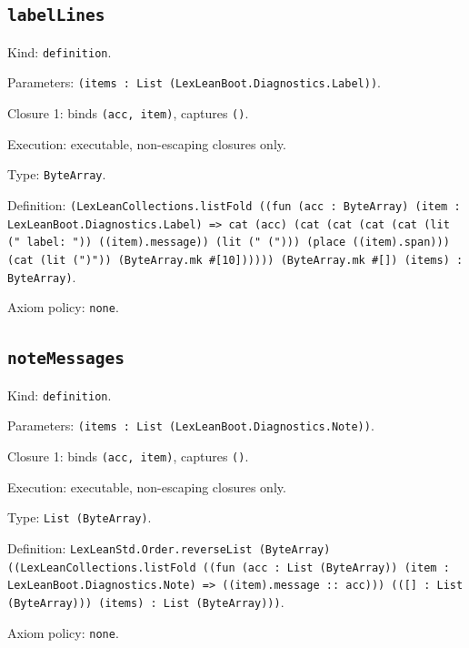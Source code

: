 \documentclass[11pt]{article}
\begin{document}
\subsection*{\texttt{labelLines}}
\noindent Kind: \texttt{definition}.\par
\noindent Parameters: \texttt{(items : List (LexLeanBoot.Diagnostics.Label))}.\par
\noindent Closure 1: binds \texttt{(acc, item)}, captures \texttt{()}.\par
\noindent Execution: executable, non-escaping closures only.\par
\noindent Type: \texttt{ByteArray}.\par
\noindent Definition: \texttt{(LexLeanCollections.listFold ((fun (acc : ByteArray) (item : LexLeanBoot.Diagnostics.Label) => cat (acc) (cat (cat (cat (cat (lit ("  label: ")) ((item).message)) (lit (" ("))) (place ((item).span))) (cat (lit (")")) (ByteArray.mk \#[10]))))) (ByteArray.mk \#[]) (items) : ByteArray)}.\par
\noindent Axiom policy: \texttt{none}.\par
\subsection*{\texttt{noteMessages}}
\noindent Kind: \texttt{definition}.\par
\noindent Parameters: \texttt{(items : List (LexLeanBoot.Diagnostics.Note))}.\par
\noindent Closure 1: binds \texttt{(acc, item)}, captures \texttt{()}.\par
\noindent Execution: executable, non-escaping closures only.\par
\noindent Type: \texttt{List (ByteArray)}.\par
\noindent Definition: \texttt{LexLeanStd.Order.reverseList (ByteArray) ((LexLeanCollections.listFold ((fun (acc : List (ByteArray)) (item : LexLeanBoot.Diagnostics.Note) => ((item).message :: acc))) (([] : List (ByteArray))) (items) : List (ByteArray)))}.\par
\noindent Axiom policy: \texttt{none}.\par
\end{document}
